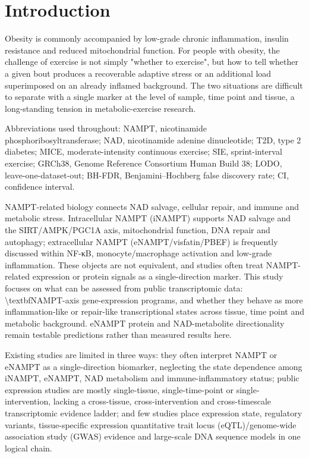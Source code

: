 \documentclass[11pt]{article}
\begin{document}
\section*{Introduction}
Obesity is commonly accompanied by low-grade chronic inflammation, insulin resistance and reduced mitochondrial function. For people with obesity, the challenge of exercise is not simply "whether to exercise", but how to tell whether a given bout produces a recoverable adaptive stress or an additional load superimposed on an already inflamed background. The two situations are difficult to separate with a single marker at the level of sample, time point and tissue, a long-standing tension in metabolic-exercise research.

Abbreviations used throughout: NAMPT, nicotinamide phosphoribosyltransferase; NAD, nicotinamide adenine dinucleotide; T2D, type 2 diabetes; MICE, moderate-intensity continuous exercise; SIE, sprint-interval exercise; GRCh38, Genome Reference Consortium Human Build 38; LODO, leave-one-dataset-out; BH-FDR, Benjamini–Hochberg false discovery rate; CI, confidence interval.

NAMPT-related biology connects NAD salvage, cellular repair, and immune and metabolic stress. Intracellular NAMPT (iNAMPT) supports NAD salvage and the SIRT/AMPK/PGC1A axis, mitochondrial function, DNA repair and autophagy; extracellular NAMPT (eNAMPT/visfatin/PBEF) is frequently discussed within NF-κB, monocyte/macrophage activation and low-grade inflammation. These objects are not equivalent, and studies often treat NAMPT-related expression or protein signals as a single-direction marker. This study focuses on what can be assessed from public transcriptomic data: \textbackslash{}textbf{NAMPT-axis gene-expression programs}, and whether they behave as more inflammation-like or repair-like transcriptional states across tissue, time point and metabolic background. eNAMPT protein and NAD-metabolite directionality remain testable predictions rather than measured results here.

Existing studies are limited in three ways: they often interpret NAMPT or eNAMPT as a single-direction biomarker, neglecting the state dependence among iNAMPT, eNAMPT, NAD metabolism and immune-inflammatory status; public expression studies are mostly single-tissue, single-time-point or single-intervention, lacking a cross-tissue, cross-intervention and cross-timescale transcriptomic evidence ladder; and few studies place expression state, regulatory variants, tissue-specific expression quantitative trait locus (eQTL)/genome-wide association study (GWAS) evidence and large-scale DNA sequence models in one logical chain.
\end{document}
